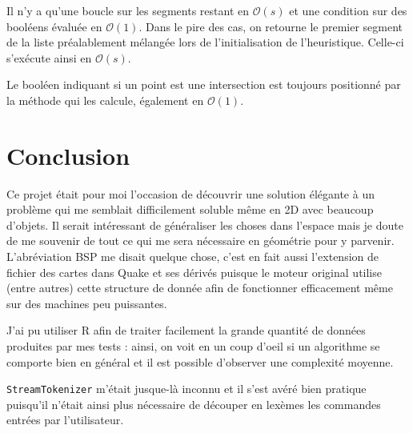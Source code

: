 \documentclass[12pt,twocolumn]{article}
\newcommand{\bigO}{\mathcal{O}}
\begin{document}
Il n'y a qu'une boucle sur les segments restant en $\bigO(s)$ et
une condition sur des booléens évaluée en $\bigO(1)$.
Dans le pire des cas, on retourne le premier segment de la liste
préalablement mélangée lors de l'initialisation de l'heuristique.
Celle-ci s'exécute ainsi en $\bigO(s)$.

Le booléen indiquant si un point est une intersection est toujours
positionné par la méthode qui les calcule, également en $\bigO(1)$.


\section{Conclusion}
Ce projet était pour moi l'occasion de découvrir une solution élégante à un
problème qui me semblait difficilement soluble même en 2D avec beaucoup d'objets.
Il serait intéressant de généraliser les choses dans l'espace mais je doute
de me souvenir de tout ce qui me sera nécessaire en géométrie pour y parvenir.
L'abréviation BSP me disait quelque chose, c'est en fait aussi l'extension de
fichier des cartes dans Quake et ses dérivés puisque le moteur original utilise
(entre autres) cette structure de donnée afin de fonctionner efficacement
même sur des machines peu puissantes.

J'ai pu utiliser R afin de traiter facilement la grande quantité de données
produites par mes tests : ainsi, on voit en un coup d'oeil si un algorithme se
comporte bien en général et il est possible d'observer une complexité moyenne.

\texttt{StreamTokenizer} m'était jusque-là inconnu et il s'est avéré bien
pratique puisqu'il n'était ainsi plus nécessaire de découper en lexèmes
les commandes entrées par l'utilisateur.



\end{document}
